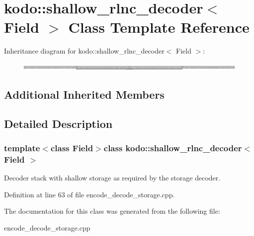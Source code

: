 \hypertarget{classkodo_1_1shallow__rlnc__decoder}{\section{kodo\-:\-:shallow\-\_\-rlnc\-\_\-decoder$<$ Field $>$ Class Template Reference}
\label{classkodo_1_1shallow__rlnc__decoder}
}
Inheritance diagram for kodo\-:\-:shallow\-\_\-rlnc\-\_\-decoder$<$ Field $>$\-:\begin{figure}[H]
\begin{center}
\leavevmode
\includegraphics[height=0.254623cm]{classkodo_1_1shallow__rlnc__decoder}
\end{center}
\end{figure}
\subsection*{Additional Inherited Members}


\subsection{Detailed Description}
\subsubsection*{template$<$class Field$>$class kodo\-::shallow\-\_\-rlnc\-\_\-decoder$<$ Field $>$}

Decoder stack with shallow storage as required by the storage decoder. 

Definition at line 63 of file encode\-\_\-decode\-\_\-storage.\-cpp.



The documentation for this class was generated from the following file\-:\begin{DoxyCompactItemize}
\item 
encode\-\_\-decode\-\_\-storage.\-cpp\end{DoxyCompactItemize}
